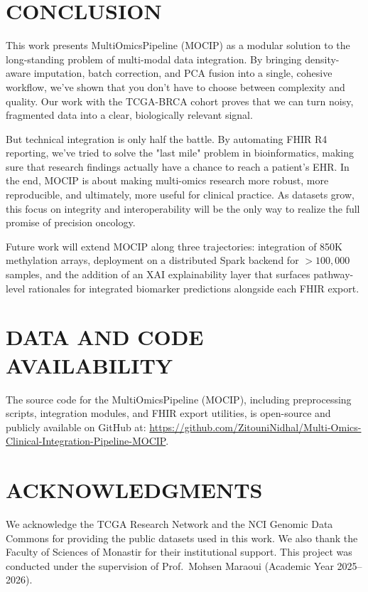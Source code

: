 \documentclass[twocolumn]{article}
\begin{document}
\section{\uppercase{Conclusion}}

This work presents MultiOmicsPipeline (MOCIP) as a modular solution to the long-standing problem of multi-modal data integration. By bringing density-aware imputation, batch correction, and PCA fusion into a single, cohesive workflow, we've shown that you don't have to choose between complexity and quality. Our work with the TCGA-BRCA cohort proves that we can turn noisy, fragmented data into a clear, biologically relevant signal.

But technical integration is only half the battle. By automating FHIR R4 reporting, we've tried to solve the "last mile" problem in bioinformatics, making sure that research findings actually have a chance to reach a patient's EHR. In the end, MOCIP is about making multi-omics research more robust, more reproducible, and ultimately, more useful for clinical practice. As datasets grow, this focus on integrity and interoperability will be the only way to realize the full promise of precision oncology.

Future work will extend MOCIP along three trajectories: integration of 850K methylation arrays, deployment on a distributed Spark backend for $>100{,}000$ samples, and the addition of an XAI explainability layer that surfaces pathway-level rationales for integrated biomarker predictions alongside each FHIR export.

\section*{\uppercase{Data and Code Availability}}
{\sloppy
The source code for the MultiOmicsPipeline (MOCIP), including preprocessing scripts, integration modules, and FHIR export utilities, is open-source and publicly available on GitHub at: \url{https://github.com/ZitouniNidhal/Multi-Omics-Clinical-Integration-Pipeline-MOCIP}.
}

\section*{\uppercase{Acknowledgments}}
\noindent We acknowledge the TCGA Research Network and the NCI Genomic Data Commons for providing the public datasets used in this work. We also thank the Faculty of Sciences of Monastir for their institutional support. This project was conducted under the supervision of Prof.\ Mohsen Maraoui (Academic Year 2025--2026).



\end{document}

